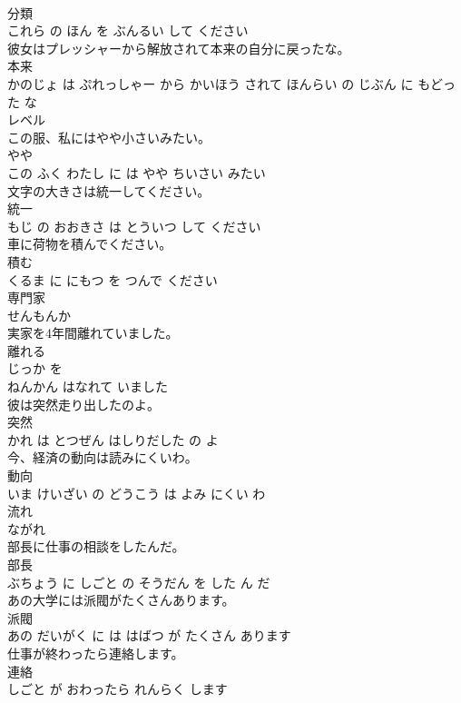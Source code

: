 \documentclass[8pt]{extreport}
\begin{document}
\begin{CJK}{UTF8}{min}
\\	分類 
\\	これら の ほん を ぶんるい して ください			
\\	彼女はプレッシャーから解放されて本来の自分に戻ったな。	
\\	本来 
\\	かのじょ は ぷれっしゃー から かいほう されて ほんらい の じぶん に もどった な			
\\	レベル	
\\	この服、私にはやや小さいみたい。	
\\	やや 
\\	この ふく わたし に は やや ちいさい みたい			
\\	文字の大きさは統一してください。	
\\	統一 
\\	もじ の おおきさ は とういつ して ください			
\\	車に荷物を積んでください。	
\\	積む 
\\	くるま に にもつ を つんで ください			
\\	専門家	
\\	せんもんか		
\\	実家を4年間離れていました。	
\\	離れる 
\\	じっか を 
\\	ねんかん はなれて いました			
\\	彼は突然走り出したのよ。	
\\	突然 
\\	かれ は とつぜん はしりだした の よ			
\\	今、経済の動向は読みにくいわ。	
\\	動向 
\\	いま けいざい の どうこう は よみ にくい わ			
\\	流れ	
\\	ながれ		
\\	部長に仕事の相談をしたんだ。	
\\	部長 
\\	ぶちょう に しごと の そうだん を した ん だ			
\\	あの大学には派閥がたくさんあります。	
\\	派閥 
\\	あの だいがく に は はばつ が たくさん あります			
\\	仕事が終わったら連絡します。	
\\	連絡 
\\	しごと が おわったら れんらく します			

\end{CJK}
\end{document}
